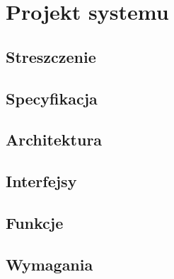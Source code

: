 \chapter{Projekt systemu}
\section{Streszczenie}
\section{Specyfikacja}
\section{Architektura}
\section{Interfejsy}
\section{Funkcje}
\section{Wymagania}

